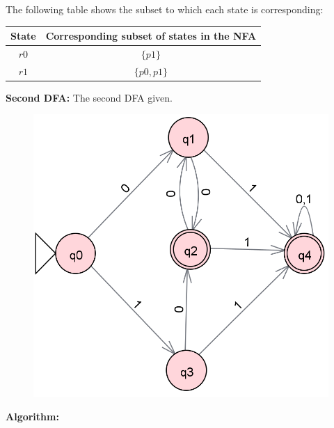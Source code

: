 \documentclass[12pt]{article}
\begin{document}
The following table shows the subset to which each state is corresponding:

\begin{center}
\begin{tabular}{|c|c|}
    \hline
    State & Corresponding subset of states in the NFA \\
    \hline
    $r0$ & $\{p1\}$ \\
    $r1$ & $\{p0, p1\}$ \\
    \hline
\end{tabular}
\end{center}

\clearpage

\textbf{Second DFA:} The second DFA given.

\begin{figure}[h]
    \centering
    \includegraphics[width=0.5\linewidth]{Second_Automaton.png}
\end{figure}

\textbf{Algorithm:}
\end{document}

